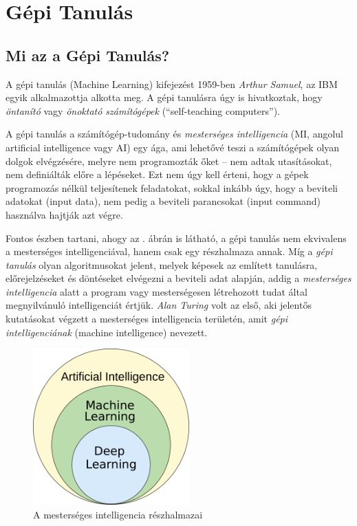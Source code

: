 \documentclass[
]{thesis-ekf}
\theoremstyle{definition}
\theoremstyle{remark}
\begin{document}
\chapter{Gépi Tanulás}
\section{Mi az a Gépi Tanulás?}

	A gépi tanulás (Machine Learning) kifejezést 1959-ben \emph{Arthur Samuel}, az IBM egyik alkalmazottja alkotta meg. A gépi tanulásra úgy is hivatkoztak, hogy \emph{öntanító} vagy \emph{önoktató számítógépek} (``self-teaching computers'').\cite{wiki-ml}

	A gépi tanulás a számítógép-tudomány és \emph{mesterséges intelligencia} (MI, angolul artificial intelligence vagy AI) egy ága, ami lehetővé teszi a számítógépek olyan dolgok elvégzésére, melyre nem programozták őket -- nem adtak utasításokat, nem definiálták előre a lépéseket. Ezt nem úgy kell érteni, hogy a gépek programozás nélkül teljesítenek feladatokat, sokkal inkább úgy, hogy a beviteli adatokat (input data), nem pedig a beviteli parancsokat (input command) használva hajtják azt végre.\cite{book:ml-for-beginners}
	
	Fontos észben tartani, ahogy az . ábrán is látható, a gépi tanulás nem ekvivalens a mesterséges intelligenciával, hanem csak egy részhalmaza annak. Míg a \emph{gépi tanulás} olyan algoritmusokat jelent, melyek képesek az említett tanulásra, előrejelzéseket és döntéseket elvégezni a beviteli adat alapján, addig a \emph{mesterséges intelligencia} alatt a program vagy mesterségesen létrehozott tudat által megnyilvánuló intelligenciát értjük.\cite{wiki-aihun, wiki-aieng} \emph{Alan Turing} volt az első, aki jelentős kutatásokat végzett a mesterséges intelligencia területén, amit \emph{gépi intelligenciának} (machine intelligence) nevezett.\cite{wiki-aihun, wiki-aieng}
	
	\begin{figure}[H]
		\centering
		\includegraphics[width=6cm]{images/ml-subfield-of-ai.png}
		\caption[A mesterséges intelligencia részhalmazai]{A mesterséges intelligencia részhalmazai\footnotemark}
		\label{fig-mestint-reszhalmazai}
	\end{figure}
	
\end{document}
